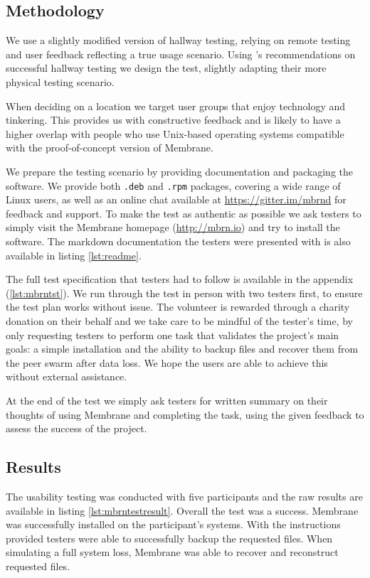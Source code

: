 \documentclass[11pt, a4paper, twoside]{report}
\def\code#1{\texttt{#1}}
\begin{document}
\subsection{Methodology}

We use a slightly modified version of hallway testing, relying on remote testing and user feedback reflecting a true usage scenario. Using \cite{usajobs2014hallway}'s recommendations on successful hallway testing we design the test, slightly adapting their more physical testing scenario.

When deciding on a location we target user groups that enjoy technology and tinkering. This provides us with constructive feedback and is likely to have a higher overlap with people who use Unix-based operating systems compatible with the proof-of-concept version of Membrane.

We prepare the testing scenario by providing documentation and packaging the software. We provide both \code{.deb} and \code{.rpm} packages, covering a wide range of Linux users, as well as an online chat available at \url{https://gitter.im/mbrnd} for feedback and support. To make the test as authentic as possible we ask testers to simply visit the Membrane homepage (\url{http://mbrn.io}) and try to install the software. The markdown documentation the testers were presented with is also available in listing \ref{lst:readme}.

The full test specification that testers had to follow is available in the appendix (\ref{lst:mbrntst}). We run through the test in person with two testers first, to ensure the test plan works without issue. The volunteer is rewarded through a charity donation on their behalf and we take care to be mindful of the tester's time, by only requesting testers to perform one task that validates the project's main goals: a simple installation and the ability to backup files and recover them from the peer swarm after data loss. We hope the users are able to achieve this without external assistance.

At the end of the test we simply ask testers for written summary on their thoughts of using Membrane and completing the task, using the given feedback to assess the success of the project.

\subsection{Results}

The usability testing was conducted with five participants and the raw results are available in listing \ref{lst:mbrntestresult}. Overall the test was a success. Membrane was successfully installed on the participant's systems. With the instructions provided testers were able to successfully backup the requested files. When simulating a full system loss, Membrane was able to recover and reconstruct requested files.
\end{document}
